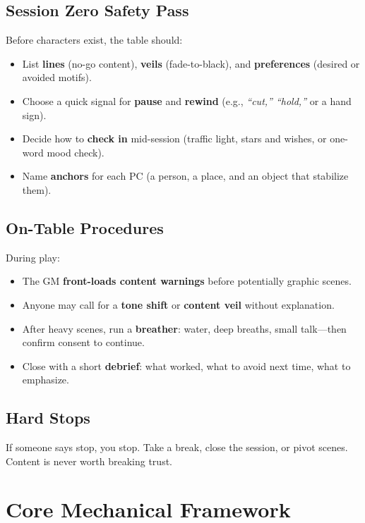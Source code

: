 \documentclass[11pt]{article}
\newcommand{\GM}{\textsc{GM}}
\newcommand{\PC}{\textsc{PC}}
\begin{document}
\subsection{Session Zero Safety Pass}

Before characters exist, the table should:
\begin{itemize}
  \item List \textbf{lines} (no-go content), \textbf{veils} (fade-to-black), and \textbf{preferences} (desired or avoided motifs).
  \item Choose a quick signal for \textbf{pause} and \textbf{rewind} (e.g., \emph{``cut,'' ``hold,''} or a hand sign).
  \item Decide how to \textbf{check in} mid-session (traffic light, stars and wishes, or one-word mood check).
  \item Name \textbf{anchors} for each \PC{} (a person, a place, and an object that stabilize them).
\end{itemize}

\subsection{On-Table Procedures}

During play:
\begin{itemize}
  \item The \GM{} \textbf{front-loads content warnings} before potentially graphic scenes.
  \item Anyone may call for a \textbf{tone shift} or \textbf{content veil} without explanation.
  \item After heavy scenes, run a \textbf{breather}: water, deep breaths, small talk—then confirm consent to continue.
  \item Close with a short \textbf{debrief}: what worked, what to avoid next time, what to emphasize.
\end{itemize}

\subsection{Hard Stops}

If someone says stop, you stop. Take a break, close the session, or pivot scenes. Content is never worth breaking trust.

\section{Core Mechanical Framework}
\end{document}
